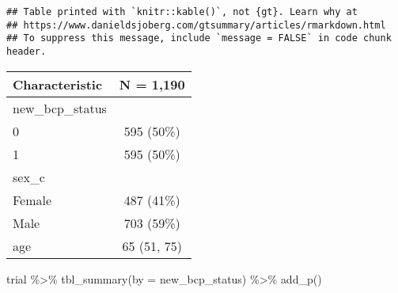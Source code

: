 \documentclass[
]{article}
\newenvironment{Shaded}{\begin{snugshade}}{\end{snugshade}}
\newcommand{\AttributeTok}[1]{\textcolor[rgb]{0.77,0.63,0.00}{#1}}
\newcommand{\CommentTok}[1]{\textcolor[rgb]{0.56,0.35,0.01}{\textit{#1}}}
\newcommand{\FunctionTok}[1]{\textcolor[rgb]{0.00,0.00,0.00}{#1}}
\newcommand{\NormalTok}[1]{#1}
\newcommand{\OtherTok}[1]{\textcolor[rgb]{0.56,0.35,0.01}{#1}}
\newcommand{\SpecialCharTok}[1]{\textcolor[rgb]{0.00,0.00,0.00}{#1}}
\newcommand{\StringTok}[1]{\textcolor[rgb]{0.31,0.60,0.02}{#1}}
\begin{document}
\begin{Shaded}
\end{Shaded}

\begin{verbatim}
## Table printed with `knitr::kable()`, not {gt}. Learn why at
## https://www.danieldsjoberg.com/gtsummary/articles/rmarkdown.html
## To suppress this message, include `message = FALSE` in code chunk header.
\end{verbatim}

\begin{longtable}[]{@{}lc@{}}
\toprule()
\textbf{Characteristic} & \textbf{N = 1,190} \\
\midrule()
\endhead
new\_bcp\_status & \\
0 & 595 (50\%) \\
1 & 595 (50\%) \\
sex\_c & \\
Female & 487 (41\%) \\
Male & 703 (59\%) \\
age & 65 (51, 75) \\
\bottomrule()
\end{longtable}

\begin{Shaded}
\begin{Highlighting}[]
\NormalTok{trial }\SpecialCharTok{\%\textgreater{}\%}
  \FunctionTok{tbl\_summary}\NormalTok{(}\AttributeTok{by =}\NormalTok{ new\_bcp\_status) }\SpecialCharTok{\%\textgreater{}\%}
  \FunctionTok{add\_p}\NormalTok{()}
\end{Highlighting}
\end{Shaded}
\end{document}
